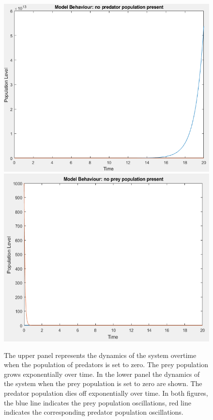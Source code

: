 \documentclass{article}
\begin{document}
\begin{figure}[H]
    \includegraphics[scale = 0.6]{no_predator.PNG}
    \includegraphics[scale = 0.6]{no_prey.PNG}
    \caption{The upper panel represents the dynamics of the system overtime when the population of predators is set to zero. The prey population grows exponentially over time. In the lower panel the dynamics of the system when the prey population is set to zero are shown. The predator population dies off exponentially over time. In both figures, the blue line indicates the prey population oscillations, red line indicates the corresponding predator population oscillations.}
    \label{fig:testing_start_values}
\end{figure}
\end{document}
